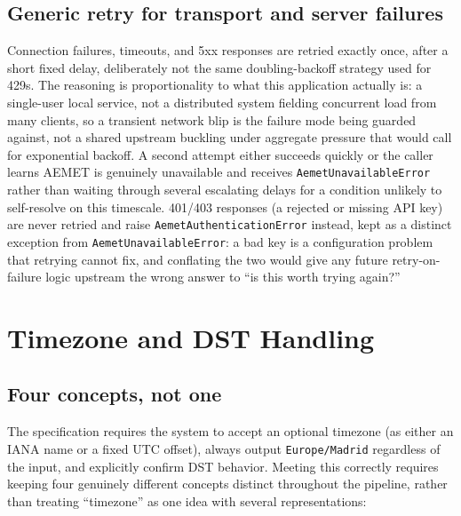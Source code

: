 \documentclass[11pt,a4paper]{article}
\begin{document}
\subsection{Generic retry for transport and server failures}
\label{sec:aemet-general-retry}

Connection failures, timeouts, and 5xx responses are retried exactly once,
after a short fixed delay, deliberately not the same doubling-backoff
strategy used for 429s. The reasoning is proportionality to what this
application actually is: a single-user local service, not a distributed
system fielding concurrent load from many clients, so a transient network
blip is the failure mode being guarded against, not a shared upstream
buckling under aggregate pressure that would call for exponential backoff.
A second attempt either succeeds quickly or the caller learns AEMET is
genuinely unavailable and receives \texttt{AemetUnavailableError} rather
than waiting through several escalating delays for a condition unlikely to
self-resolve on this timescale. 401/403 responses (a rejected or missing
API key) are never retried and raise \texttt{AemetAuthenticationError}
instead, kept as a distinct exception from \texttt{AemetUnavailableError}:
a bad key is a configuration problem that retrying cannot fix, and
conflating the two would give any future retry-on-failure logic upstream
the wrong answer to ``is this worth trying again?''

\section{Timezone and DST Handling}
\label{sec:timezone-dst}

\subsection{Four concepts, not one}

The specification requires the system to accept an optional timezone (as
either an IANA name or a fixed UTC offset), always output
\texttt{Europe/Madrid} regardless of the input, and explicitly confirm DST
behavior. Meeting this correctly requires keeping four genuinely different
concepts distinct throughout the pipeline, rather than treating
``timezone'' as one idea with several representations:
\end{document}
